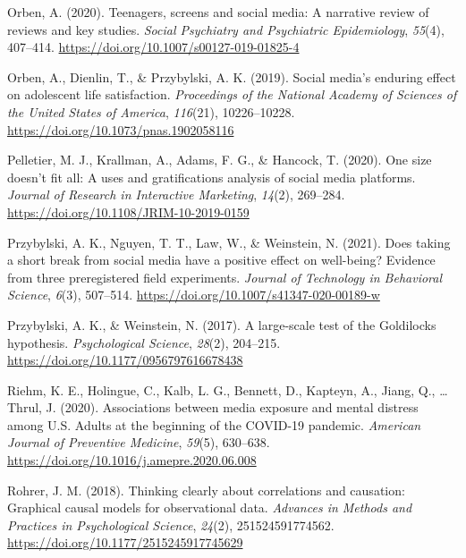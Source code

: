 \documentclass[
  man,mask]{apa6}
\newlength{\cslhangindent}
\newlength{\cslentryspacingunit} %
\newenvironment{CSLReferences}[2] %
 {%
  \setlength{\parindent}{0pt}
  \ifodd #1
  \let\oldpar\par
  \def\par{\hangindent=\cslhangindent\oldpar}
  \fi
  \setlength{\parskip}{#2\cslentryspacingunit}
 }%
 {}
\begin{document}
\begin{CSLReferences}{1}{0}
\leavevmode{}%
Orben, A. (2020). Teenagers, screens and social media: A narrative review of reviews and key studies. \emph{Social Psychiatry and Psychiatric Epidemiology}, \emph{55}(4), 407--414. \url{https://doi.org/10.1007/s00127-019-01825-4}

\leavevmode{}%
Orben, A., Dienlin, T., \& Przybylski, A. K. (2019). Social media's enduring effect on adolescent life satisfaction. \emph{Proceedings of the National Academy of Sciences of the United States of America}, \emph{116}(21), 10226--10228. \url{https://doi.org/10.1073/pnas.1902058116}

\leavevmode{}%
Pelletier, M. J., Krallman, A., Adams, F. G., \& Hancock, T. (2020). One size doesn't fit all: A uses and gratifications analysis of social media platforms. \emph{Journal of Research in Interactive Marketing}, \emph{14}(2), 269--284. \url{https://doi.org/10.1108/JRIM-10-2019-0159}

\leavevmode{}%
Przybylski, A. K., Nguyen, T. T., Law, W., \& Weinstein, N. (2021). Does taking a short break from social media have a positive effect on well-being? {Evidence} from three preregistered field experiments. \emph{Journal of Technology in Behavioral Science}, \emph{6}(3), 507--514. \url{https://doi.org/10.1007/s41347-020-00189-w}

\leavevmode{}%
Przybylski, A. K., \& Weinstein, N. (2017). A large-scale test of the {Goldilocks} hypothesis. \emph{Psychological Science}, \emph{28}(2), 204--215. \url{https://doi.org/10.1177/0956797616678438}

\leavevmode{}%
Riehm, K. E., Holingue, C., Kalb, L. G., Bennett, D., Kapteyn, A., Jiang, Q., \ldots{} Thrul, J. (2020). Associations between media exposure and mental distress among {U}.{S}. Adults at the beginning of the {COVID-19} pandemic. \emph{American Journal of Preventive Medicine}, \emph{59}(5), 630--638. \url{https://doi.org/10.1016/j.amepre.2020.06.008}

\leavevmode{}%
Rohrer, J. M. (2018). Thinking clearly about correlations and causation: {Graphical} causal models for observational data. \emph{Advances in Methods and Practices in Psychological Science}, \emph{24}(2), 251524591774562. \url{https://doi.org/10.1177/2515245917745629}


\end{CSLReferences}
\end{document}
